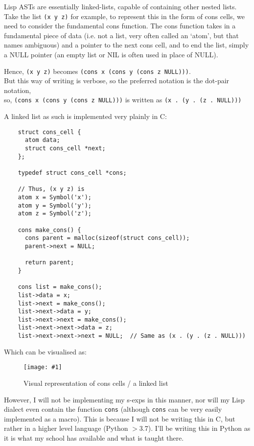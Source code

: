 \documentclass{article}
\newcommand{\code}[1]{\texttt{#1}}
\newcommand{\graph}[2]{
  \begin{figure}[H]
    \centering
    \texttt{[image: \#1]}
    \caption{#2}
  \end{figure}
}
\begin{document}
    Lisp ASTs are essentially linked-lists, capable of containing other nested
    lists.  Take the list \code{(x y z)} for example, to represent this in the form
    of cons cells, we need to consider the fundamental cons function. The cons
    function takes in a fundamental piece of data (i.e. not a list, very often
    called an `atom', but that names ambiguous) and a pointer
    to the next cons cell, and to end the list, simply a NULL pointer (an empty
    list or NIL is often used in place of NULL).

    Hence, \code{(x y z)} becomes \code{(cons x (cons y (cons z NULL)))}.\\
    But this way of writing is verbose, so the preferred notation is the
    dot-pair notation,\\
    so, \code{(cons x (cons y (cons z NULL)))} is written as \code{(x . (y . (z . NULL)))}

    \clearpage
    A linked list as such is implemented very plainly in C:

    \begin{verbatim}
    struct cons_cell {
      atom data;
      struct cons_cell *next;
    };

    typedef struct cons_cell *cons;

    // Thus, (x y z) is
    atom x = Symbol('x');
    atom y = Symbol('y');
    atom z = Symbol('z');

    cons make_cons() {
      cons parent = malloc(sizeof(struct cons_cell));
      parent->next = NULL;

      return parent;
    }

    cons list = make_cons();
    list->data = x;
    list->next = make_cons();
    list->next->data = y;
    list->next->next = make_cons();
    list->next->next->data = z;
    list->next->next->next = NULL;  // Same as (x . (y . (z . NULL)))
    \end{verbatim}

    Which can be visualised as:
    \graph{cons-cells}{Visual representation of cons cells / a linked list}


    However, I will not be implementing my s-exps in this manner, nor
    will my Lisp dialect even contain the function \code{cons}
    (although \code{cons} can be very easily implemented as a macro).
    This is  because I will not be writing this in C, but rather in a higher
    level language (Python $>$3.7).  I'll be writing this in Python as it is
    what my school has available and what is taught there.
\end{document}
